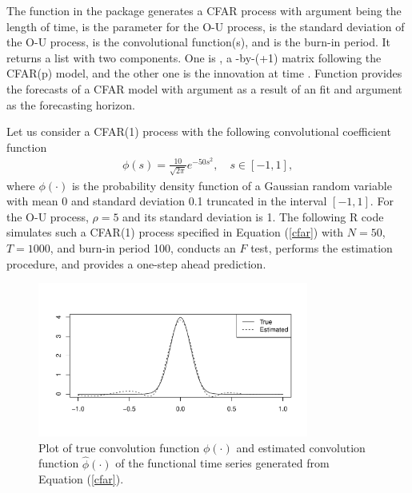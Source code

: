 The function  in the  package generates a CFAR process with argument  being the length of time,  is the parameter for the O-U process,  is the standard deviation of the O-U process,  is the convolutional function(s), and  is the burn-in period. It returns a list with two components. One is , a -by-(+1) matrix following the CFAR(p) model, and the other one  is the innovation at time .
Function  provides the forecasts of a CFAR model with argument  as a result of an  fit and argument  as the forecasting horizon.

Let us consider a CFAR(1) process with the following convolutional coefficient function
\begin{align}\label{cfar}
\phi(s)=\frac{10}{\sqrt{2\pi }}e^{-50s^2}, \quad s\in[-1,1],
\end{align}
where $\phi(\cdot)$ is the probability density function of a Gaussian random variable with mean 0 and standard deviation 0.1 truncated in the interval $[-1,1]$. For the O-U process, $\rho=5$ and its standard deviation is 1. The following {R} code simulates such a CFAR(1) process specified in Equation (\ref{cfar}) with $N=50$, $T=1000$, and burn-in period 100, conducts an $F$ test, performs the estimation procedure,
and provides a one-step ahead prediction.



\begin{figure}[t!]
\centering
\includegraphics[width=3.5in]{article-cfar_plot}
\caption{Plot of true convolution function $\phi(\cdot)$ and estimated convolution function $\hat{\phi}(\cdot)$ of the functional time series generated from Equation (\ref{cfar}).}
\label{fig:cfar}
\end{figure}




